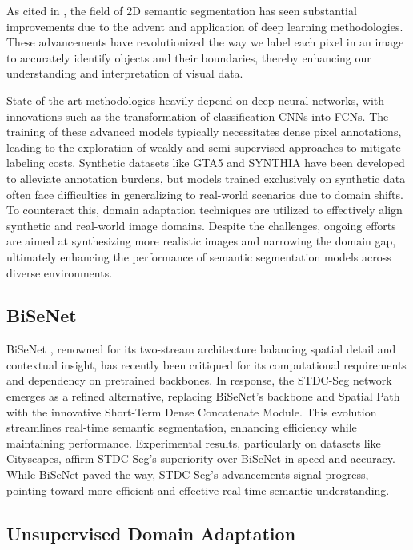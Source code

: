 \documentclass[10pt,twocolumn,letterpaper]{article}
\begin{document}
As cited in \cite{SemanticSeg}, the field of 2D semantic segmentation has seen substantial improvements due to the advent and application of deep learning methodologies. These advancements have revolutionized the way we label each pixel in an image to accurately identify objects and their boundaries, thereby enhancing our understanding and interpretation of visual data.

State-of-the-art methodologies heavily depend on deep neural networks, with innovations such as the transformation of classification CNNs into FCNs. The training of these advanced models typically necessitates dense pixel annotations, leading to the exploration of weakly and semi-supervised approaches to mitigate labeling costs. Synthetic datasets like GTA5 and SYNTHIA have been developed to alleviate annotation burdens, but models trained exclusively on synthetic data often face difficulties in generalizing to real-world scenarios due to domain shifts. To counteract this, domain adaptation techniques are utilized to effectively align synthetic and real-world image domains. Despite the challenges, ongoing efforts are aimed at synthesizing more realistic images and narrowing the domain gap, ultimately enhancing the performance of semantic segmentation models across diverse environments.

\subsection{BiSeNet}

BiSeNet \cite{BiS}, renowned for its two-stream architecture balancing spatial detail and contextual insight, has recently been critiqued for its computational requirements and dependency on pretrained backbones. In response, the STDC-Seg network \cite{RealTimeBiSeNet} emerges as a refined alternative, replacing BiSeNet's backbone and Spatial Path with the innovative Short-Term Dense Concatenate Module. This evolution streamlines real-time semantic segmentation, enhancing efficiency while maintaining performance. Experimental results, particularly on datasets like Cityscapes, affirm STDC-Seg's superiority over BiSeNet in speed and accuracy. While BiSeNet paved the way, STDC-Seg's advancements signal progress, pointing toward more efficient and effective real-time semantic understanding.

\subsection{Unsupervised Domain Adaptation}
\end{document}
